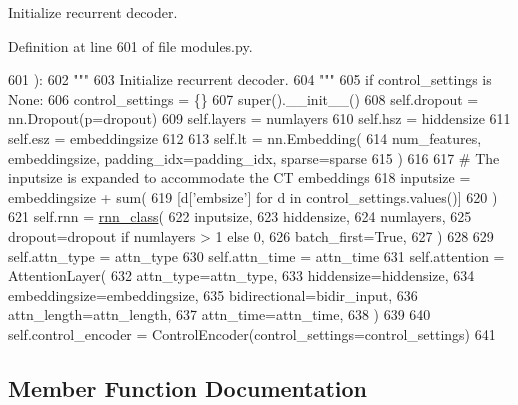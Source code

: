 \begin{DoxyVerb}Initialize recurrent decoder.
\end{DoxyVerb}
 

Definition at line 601 of file modules.\+py.


\begin{DoxyCode}
601     ):
602         \textcolor{stringliteral}{"""}
603 \textcolor{stringliteral}{        Initialize recurrent decoder.}
604 \textcolor{stringliteral}{        """}
605         \textcolor{keywordflow}{if} control\_settings \textcolor{keywordflow}{is} \textcolor{keywordtype}{None}:
606             control\_settings = \{\}
607         super().\_\_init\_\_()
608         self.dropout = nn.Dropout(p=dropout)
609         self.layers = numlayers
610         self.hsz = hiddensize
611         self.esz = embeddingsize
612 
613         self.lt = nn.Embedding(
614             num\_features, embeddingsize, padding\_idx=padding\_idx, sparse=sparse
615         )
616 
617         \textcolor{comment}{# The inputsize is expanded to accommodate the CT embeddings}
618         inputsize = embeddingsize + sum(
619             [d[\textcolor{stringliteral}{'embsize'}] \textcolor{keywordflow}{for} d \textcolor{keywordflow}{in} control\_settings.values()]
620         )
621         self.rnn = \hyperlink{namespaceseq2seq_1_1train_a1b062073c766f1d34a67f572ef256ba0}{rnn\_class}(
622             inputsize,
623             hiddensize,
624             numlayers,
625             dropout=dropout \textcolor{keywordflow}{if} numlayers > 1 \textcolor{keywordflow}{else} 0,
626             batch\_first=\textcolor{keyword}{True},
627         )
628 
629         self.attn\_type = attn\_type
630         self.attn\_time = attn\_time
631         self.attention = AttentionLayer(
632             attn\_type=attn\_type,
633             hiddensize=hiddensize,
634             embeddingsize=embeddingsize,
635             bidirectional=bidir\_input,
636             attn\_length=attn\_length,
637             attn\_time=attn\_time,
638         )
639 
640         self.control\_encoder = ControlEncoder(control\_settings=control\_settings)
641 
\end{DoxyCode}


\subsection{Member Function Documentation}
\mbox{\label{classprojects_1_1controllable__dialogue_1_1controllable__seq2seq_1_1modules_1_1RNNDecoder_acfba6f98c3a1b7a9bd95981a8b5b79a5}} 
